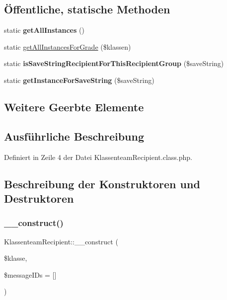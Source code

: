 \subsection*{Öffentliche, statische Methoden}
\begin{DoxyCompactItemize}
\item 
\mbox{\label{class_klassenteam_recipient_a34ba6eb28f4a0877690f9e9ffc4ceff7}} 
static {\bfseries get\+All\+Instances} ()
\item 
static \mbox{\hyperlink{class_klassenteam_recipient_a4142e5290ce7f5890fa785db11f23a03}{get\+All\+Instances\+For\+Grade}} (\$klassen)
\item 
\mbox{\label{class_klassenteam_recipient_affc49dfe77f00b820095d76411d96d9c}} 
static {\bfseries is\+Save\+String\+Recipient\+For\+This\+Recipient\+Group} (\$save\+String)
\item 
\mbox{\label{class_klassenteam_recipient_a3aa1964ce4ff4b2de74d38f4fb5c09b6}} 
static {\bfseries get\+Instance\+For\+Save\+String} (\$save\+String)
\end{DoxyCompactItemize}
\subsection*{Weitere Geerbte Elemente}


\subsection{Ausführliche Beschreibung}


Definiert in Zeile 4 der Datei Klassenteam\+Recipient.\+class.\+php.



\subsection{Beschreibung der Konstruktoren und Destruktoren}
\mbox{\label{class_klassenteam_recipient_af0771111ee73b88f71be5bfae95f33f7}} 
\subsubsection{\texorpdfstring{\+\_\+\+\_\+construct()}{\_\_construct()}}
{\footnotesize\ttfamily Klassenteam\+Recipient\+::\+\_\+\+\_\+construct (\begin{DoxyParamCaption}\item[{}]{\$klasse,  }\item[{}]{\$message\+I\+Ds = {\ttfamily \mbox{[}\mbox{]}} }\end{DoxyParamCaption})}

